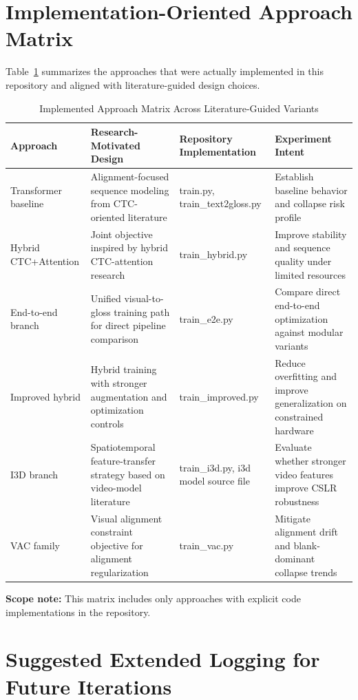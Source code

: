 \section{Implementation-Oriented Approach Matrix}

Table~\ref{tab:config_delta} summarizes the approaches that were actually implemented in this repository and aligned with literature-guided design choices.

\begin{table}[H]
\centering
\caption{Implemented Approach Matrix Across Literature-Guided Variants}
\label{tab:config_delta}
\begingroup
\footnotesize
\setlength{\tabcolsep}{4pt}
\begin{tabularx}{\textwidth}{@{}p{2.2cm}Xp{3.2cm}X@{}}
\toprule
\textbf{Approach} & \textbf{Research-Motivated Design} & \textbf{Repository Implementation} & \textbf{Experiment Intent} \\
\midrule
Transformer baseline & Alignment-focused sequence modeling from CTC-oriented literature & train.py, train\_text2gloss.py & Establish baseline behavior and collapse risk profile \\
Hybrid CTC+Attention & Joint objective inspired by hybrid CTC-attention research & train\_hybrid.py & Improve stability and sequence quality under limited resources \\
End-to-end branch & Unified visual-to-gloss training path for direct pipeline comparison & train\_e2e.py & Compare direct end-to-end optimization against modular variants \\
Improved hybrid & Hybrid training with stronger augmentation and optimization controls & train\_improved.py & Reduce overfitting and improve generalization on constrained hardware \\
I3D branch & Spatiotemporal feature-transfer strategy based on video-model literature & train\_i3d.py, i3d model source file & Evaluate whether stronger video features improve CSLR robustness \\
VAC family & Visual alignment constraint objective for alignment regularization & train\_vac.py & Mitigate alignment drift and blank-dominant collapse trends \\
\bottomrule
\end{tabularx}
\endgroup
\end{table}

\noindent\textbf{Scope note:} This matrix includes only approaches with explicit code implementations in the repository.

\section{Suggested Extended Logging for Future Iterations}


